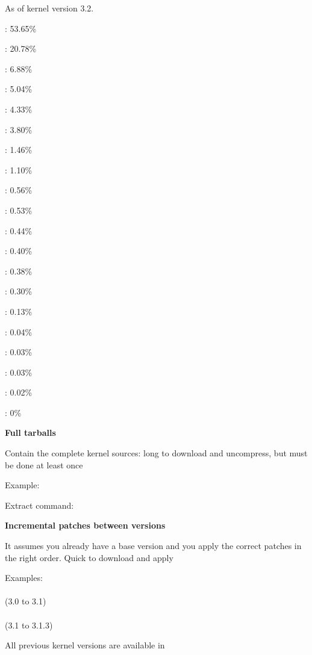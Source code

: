   As of kernel version 3.2.
    \startitemize
    \item {}: 53.65\%
    \item {}: 20.78\%
    \item {}: 6.88\%
    \item {}: 5.04\%
    \item {}: 4.33\%
    \item {}: 3.80\%
    \item {}: 1.46\%
    \item {}: 1.10\%
    \item {}: 0.56\%
    \item {}: 0.53\%
    \stopitemize
    \startitemize
    \item {}: 0.44\%
    \item {}: 0.40\%
    \item {}: 0.38\%
    \item {}: 0.30\%
    \item {}: 0.13\%
    \item {}: 0.04\%
    \item {}: 0.03\%
    \item {}: 0.03\%
    \item {}: 0.02\%
    \item {}: 0\%
    \stopitemize

  \startitemize
  \item {\bf Full tarballs}
    \startitemize
    \item Contain the complete kernel sources: long to download and
      uncompress, but must be done at least once
    \item Example:\\
    \item Extract command:\\
    \stopitemize
  \item {\bf Incremental patches between versions}
    \startitemize
    \item It assumes you already have a base version and you apply the
      correct patches in the right order. Quick to download and apply
    \item Examples:\\
      \\(3.0 to 3.1)\\
      \\(3.1 to 3.1.3)
    \stopitemize
  \item All previous kernel versions are available in
  \stopitemize


